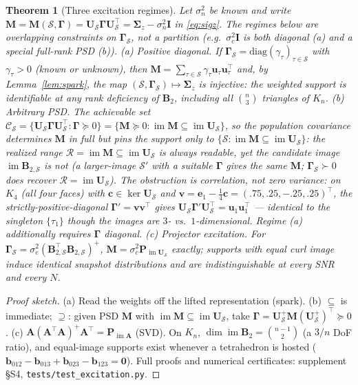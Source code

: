 \documentclass{article}
\newtheorem{theorem}{Theorem}
\DeclareMathOperator{\im}{im}
\newcommand{\B}{\bm{B}}
\newcommand{\Scal}{\mathcal{S}}
\newcommand{\Rcal}{\mathcal{R}}
\newcommand{\Ccal}{\mathcal{C}}
\newcommand{\Gam}{\bm{\Gamma}}
\begin{document}
\begin{theorem}[Three excitation regimes]\label{thm:tri}
Let $\sigma_n^2$ be known and write $\bm M=\bm M(\Scal,\Gam)=
\bm U_\Scal\Gam\bm U_\Scal^{\!\top}=\bm\Sigma_z-\sigma_n^2\bm I$ in
\eqref{eq:sigz}. The regimes below are overlapping constraints on
$\Gam_\Scal$, not a partition (e.g.\ $\sigma_c^2\bm I$ is both diagonal (a) and
a special full-rank PSD (b)).
\emph{(a) Positive diagonal.} If $\Gam_\Scal=\mathrm{diag}(\gamma_\tau)_{\tau\in\Scal}$
with $\gamma_\tau>0$ (known or unknown), then
$\bm M=\sum_{\tau\in\Scal}\gamma_\tau\bm u_\tau\bm u_\tau^{\!\top}$ and, by
Lemma~\ref{lem:spark}, the map $(\Scal,\Gam_\Scal)\mapsto\bm\Sigma_z$ is
injective: the weighted support is identifiable at \emph{any} rank deficiency
of $\B_2$, including all $\binom n3$ triangles of $K_n$.
\emph{(b) Arbitrary PSD.} The achievable set
$\Ccal_\Scal=\{\bm U_\Scal\Gam\bm U_\Scal^{\!\top}:\Gam\succeq0\}
=\{\bm M\succeq0:\im\bm M\subseteq\im\bm U_\Scal\}$, so the \emph{population}
covariance determines $\bm M$ in full but pins the support only to
$\{\Scal:\im\bm M\subseteq\im\bm U_\Scal\}$: the realized range
$\Rcal=\im\bm M\subseteq\im\bm U_\Scal$ is always readable, yet the candidate
image $\im\B_{2,\Scal}$ is not (a larger-image $\Scal'$ with a suitable $\Gam$
gives the same $\bm M$; $\Gam_\Scal\succ0$ does recover $\Rcal=\im\bm U_\Scal$).
The obstruction is \emph{correlation}, not zero variance: on $K_4$ (all four
faces) with $\bm c\in\ker\bm U_\Scal$ and
$\bm v=\bm e_1-\tfrac14\bm c=(.75,.25,-.25,.25)^{\!\top}$, the
strictly-positive-diagonal $\Gam'=\bm v\bm v^{\!\top}$ gives
$\bm U_\Scal\Gam'\bm U_\Scal^{\!\top}=\bm u_1\bm u_1^{\!\top}$ --- identical to
the singleton $\{\tau_1\}$ though the images are $3$- vs.\ $1$-dimensional.
Regime (a) additionally requires $\Gam$ \emph{diagonal}.
\emph{(c) Projector excitation.} For
$\Gam_\Scal=\sigma_c^2(\B_{2,\Scal}^{\!\top}\B_{2,\Scal})^{+}$,
$\bm M=\sigma_c^2\bm P_{\im\bm U_\Scal}$ \emph{exactly}; supports with equal
curl image induce \emph{identical} snapshot distributions and are
indistinguishable at every SNR and every $N$.
\end{theorem}
\begin{proof}[Proof sketch]
(a) Read the weights off the lifted representation (spark). (b)
$\subseteq$ is immediate; $\supseteq$: given PSD $\bm M$ with
$\im\bm M\subseteq\im\bm U_\Scal$, take
$\Gam=\bm U_\Scal^{+}\bm M(\bm U_\Scal^{+})^{\!\top}\succeq0$. (c)
$\bm A(\bm A^{\!\top}\bm A)^{+}\bm A^{\!\top}=\bm P_{\im\bm A}$ (SVD). On
$K_n$, $\dim\im\B_2=\binom{n-1}{2}$ (a $3/n$ DoF ratio), and equal-image
supports exist whenever a tetrahedron is hosted
($\bm b_{012}-\bm b_{013}+\bm b_{023}-\bm b_{123}=\bm0$). Full proofs and
numerical certificates: supplement \S S4, \texttt{tests/test\_excitation.py}.
\end{proof}
\end{document}
